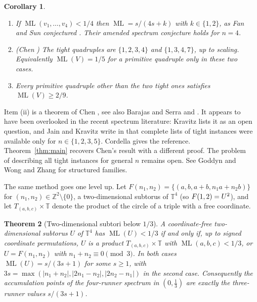 \documentclass[12pt]{amsart}
\newtheorem{theorem}{Theorem}[section]
\newtheorem{corollary}[theorem]{Corollary}
\theoremstyle{definition}\newtheorem{definition}[theorem]{Definition}
\theoremstyle{remark}\newtheorem{remark}[theorem]{Remark}
\newcommand{\Z}{\mathbb Z}\newcommand{\R}{\mathbb R}\newcommand{\T}{\mathbb T}
\newcommand{\ML}{\operatorname{ML}}
\begin{document}
\begin{corollary}\label{cor:consequences}
\begin{enumerate}[label=\textup{(\roman*)},leftmargin=*]
\item If $\ML(v_1,\dots,v_4)<1/4$ then $\ML=s/(4s+k)$ with $k\in\{1,2\}$, as Fan and Sun conjectured \cite[Conjecture~4.1]{FanSun}. Their amended spectrum conjecture holds for $n=4$.
\item \textup{(Chen \cite{Chen})} The tight quadruples are $\{1,2,3,4\}$ and $\{1,3,4,7\}$, up to scaling. Equivalently $\ML(V)=1/5$ for a primitive quadruple only in these two cases.
\item Every primitive quadruple other than the two tight ones satisfies $\ML(V)\ge 2/9$.
\end{enumerate}
\end{corollary}

Item (ii) is a theorem of Chen \cite{Chen}, see also Barajas and Serra \cite{BarajasSerraDM} and \cite[Section~4]{PerarnauSerra}. It appears to have been overlooked in the recent spectrum literature: Kravitz \cite[Section~13]{Kravitz} lists it as an open question, and Jain and Kravitz write in \cite{JainKravitz} that complete lists of tight instances were available only for $n\in\{1,2,3,5\}$. Cordella \cite[Section~2.5]{Cordella} gives the reference. Theorem~\ref{thm:main} recovers Chen's result with a different proof. The problem of describing all tight instances for general $n$ \cite[Problem~1]{PerarnauSerra} remains open. See Goddyn and Wong \cite{GoddynWong} and Zhang \cite{Zhang} for structured families.

The same method goes one level up. Let $F(n_1,n_2)=\{(a,b,a+b,n_1a+n_2b)\}$ for $(n_1,n_2)\in\Z^2\setminus\{0\}$, a two-dimensional subtorus of $\T^4$ (so $F(1,2)=U^{2}$), and let $T_{(a,b,c)}\times\T$ denote the product of the circle of a triple with a free coordinate.

\begin{theorem}[Two-dimensional subtori below $1/3$]\label{thm:second-intro}
A coordinate-free two-dimensional subtorus $U$ of $\T^4$ has $\ML(U)<1/3$ if and only if, up to signed coordinate permutations, $U$ is a product $T_{(a,b,c)}\times\T$ with $\ML(a,b,c)<1/3$, or $U=F(n_1,n_2)$ with $n_1+n_2\equiv0\pmod3$. In both cases $\ML(U)=s/(3s+1)$ for some $s\ge1$, with $3s=\max(|n_1+n_2|,|2n_1-n_2|,|2n_2-n_1|)$ in the second case. Consequently the accumulation points of the four-runner spectrum in $(0,\frac13)$ are exactly the three-runner values $s/(3s+1)$.
\end{theorem}
\end{document}
